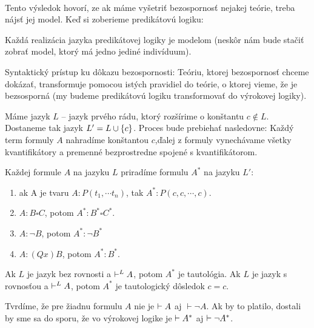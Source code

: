 \paragraph{}
\par Tento výsledok hovorí, ze ak máme vyšetriť bezospornosť nejakej teórie,
treba nájsť jej model. Keď si zoberieme predikátovú logiku:

\par Každá realizácia jazyka predikátovej logiky je modelom (neskôr nám bude
stačiť zobrať model, ktorý má jedno jediné indivíduum).

\par
Syntaktický prístup ku dôkazu bezospornosti: Teóriu, ktorej bezospornosť chceme
dokázať, transformuje pomocou istých pravidiel do teórie, o ktorej vieme, že je
bezsosporná  (my budeme predikátovú logiku transformovať do výrokovej logiky).

\begin{priklad}
    Máme jazyk $L$ -- jazyk prvého rádu, ktorý rozšírime o konštantu $c \notin L$.
    Dostaneme tak jazyk $L' = L \cup \{c\}$.
    Proces \fixme{} bude prebiehať nasledovne:
    Každý term formuly $A$ nahradíme konštantou $c$,ďalej  z formuly
    vynechávame všetky kvantifikátory a premenné bezprostredne spojené s
    kvantifikátorom.

    Každej formule $A$ na jazyku $L$ priradíme formulu $A^*$ na jazyku $L'$:
    \begin{enumerate}
            \item ak A je tvaru $A: P(t_1, \cdots t_n)$, tak $A^*: P(c, c, \cdots,c)$.
            \item $A: B \square C$, potom $A^*: B^* \square C^*$.
            \item $A: \neg B$, potom $A^*: \neg B^*$
            \item $A: (Qx) B$, potom $A^*: B^*$.
    \end{enumerate}

Ak $L$ je jazyk bez rovnosti a $\vdash^L A$, potom $A^*$ je tautológia. Ak $L$
je jazyk s rovnosťou a $\vdash^L A$, potom $A^*$ je tautologický dôsledok $c=c$.

\par Tvrdíme, že pre žiadnu formulu $A$ nie je $\vdash A$ aj $\vdash \neg A$. Ak
by to platilo, dostali by sme sa do sporu, že vo výrokovej logike je $\vdash
A^*$ aj $\vdash \neg A^*$.
\end{priklad}

